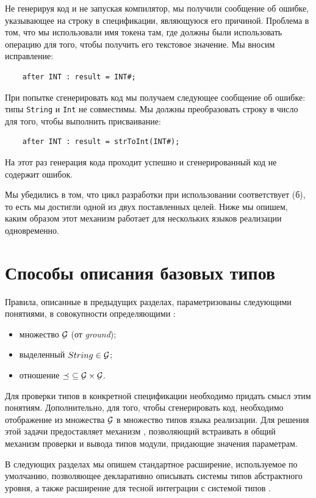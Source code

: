 Не генерируя код и не запуская компилятор, мы получили сообщение об ошибке, указывающее на строку в спецификации, являющуюся его причиной. Проблема в том, что мы использовали имя токена там, где должны были использовать операцию \code{\#} для того, чтобы получить его текстовое значение. Мы вносим исправление:
\begin{lstlisting}
	after INT : result = INT#;
\end{lstlisting}
При попытке сгенерировать код мы получаем следующее сообщение об ошибке: типы \texttt{String} и \texttt{Int} не совместимы. Мы должны преобразовать строку в число для того, чтобы выполнить присваивание:
\begin{lstlisting}
	after INT : result = strToInt(INT#);
\end{lstlisting}
На этот раз генерация кода проходит успешно и сгенерированный код не содержит ошибок.

Мы убедились в том, что цикл разработки при использовании \ATF{} соответствует  (б), то есть мы достигли одной из двух поставленных целей. Ниже мы опишем, каким образом этот механизм работает для нескольких языков реализации одновременно.

\section{Способы описания базовых типов}

Правила, описанные в предыдущих разделах, параметризованы следующими понятиями, в совокупности определяющими :
\begin{itemize}
\item множество  ${\mathcal{G}_{}}$ (от \emph{ground});
\item выделенный  $String_{} \in {\mathcal{G}_{}}$;
\item отношение $\preceq_{} \;\subseteq {\mathcal{G}_{}} \times {\mathcal{G}_{}}$.
\end{itemize}
Для проверки типов в конкретной спецификации необходимо придать смысл этим понятиям. Дополнительно, для того, чтобы сгенерировать код, необходимо отображение из множества ${\mathcal{G}_{}}$ в множество типов языка реализации.
Для решения этой задачи \ATF{} предоставляет механизм , позволяющий встраивать в общий механизм проверки и вывода типов модули, придающие значения параметрам. 

В следующих разделах мы опишем стандартное расширение, используемое по умолчанию, позволяющее декларативно описывать системы типов абстрактного уровня, а также расширение для тесной интеграции с системой типов .

